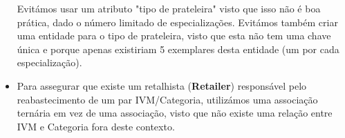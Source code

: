 \documentclass[12pt,a4paper]{article}
\begin{document}
\begin{itemize}
      Evitámos usar um atributo "tipo de prateleira" visto que isso não é boa prática,
      dado o número limitado de especializações. Evitámos também criar uma entidade
      para o tipo de prateleira, visto que esta não tem uma chave única e porque
      apenas existiriam 5 exemplares desta entidade (um por cada especialização).
    \item Para assegurar que existe um retalhista (\textbf{Retailer}) responsável
      pelo reabastecimento de um par IVM/Categoria, utilizámos uma associação ternária
      em vez de uma associação, visto que não existe uma relação entre IVM e Categoria
      fora deste contexto.
  \end{itemize}
\end{document}
